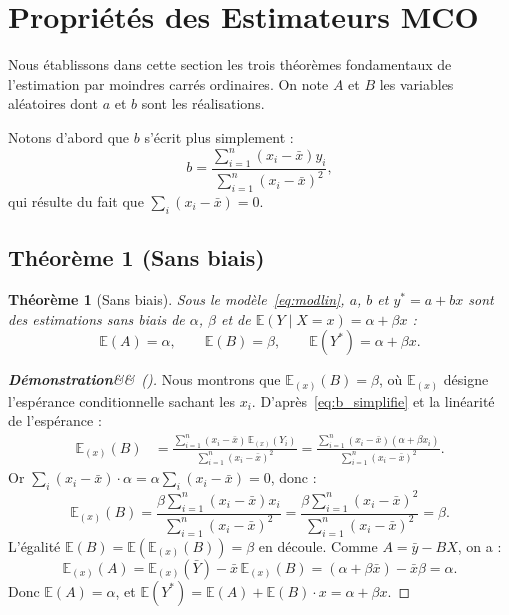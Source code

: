 \documentclass[12pt,a4paper]{article}
\newtheorem{theoreme}{Théorème}[section]
\theoremstyle{definition}
\theoremstyle{remark}
\newenvironment{demonstration}[1][]
  {\begin{proof}[\textbf{Démonstration}\ifx&#1&\else\ (#1)\fi]}
  {\end{proof}}
\newcommand{\Esp}{\mathbb{E}}
\newcommand{\xbar}{\bar{x}}
\newcommand{\ybar}{\bar{y}}
\begin{document}

\section{Propriétés des Estimateurs MCO}
\label{sec:proprietes}

Nous établissons dans cette section les trois théorèmes fondamentaux
de l'estimation par moindres carrés ordinaires. On note $A$ et $B$ les variables
aléatoires dont $a$ et $b$ sont les réalisations.

Notons d'abord que $b$ s'écrit plus simplement :
\begin{equation}
  \label{eq:b_simplifie}
  b = \frac{\sum_{i=1}^n (x_i - \xbar) y_i}{\sum_{i=1}^n (x_i - \xbar)^2},
\end{equation}
qui résulte du fait que $\sum_i (x_i - \xbar) = 0$.

  
\subsection{Théorème 1 (Sans biais)}

\begin{theoreme}[Sans biais]
\label{thm:unbiased}
Sous le modèle~\eqref{eq:modlin}, $a$, $b$ et $y^* = a + bx$ sont des estimations
sans biais de $\alpha$, $\beta$ et de $\Esp(Y \mid X = x) = \alpha + \beta x$ :
\[
  \Esp(A) = \alpha, \qquad \Esp(B) = \beta, \qquad \Esp(Y^*) = \alpha + \beta x.
\]
\end{theoreme}

\begin{demonstration}
Nous montrons que $\Esp_{(x)}(B) = \beta$, où $\Esp_{(x)}$ désigne l'espérance
conditionnelle sachant les $x_i$.
D'après~\eqref{eq:b_simplifie} et la linéarité de l'espérance :
\begin{align*}
  \Esp_{(x)}(B)
  &= \frac{\sum_{i=1}^n (x_i - \xbar)\,\Esp_{(x)}(Y_i)}{\sum_{i=1}^n (x_i - \xbar)^2}
   = \frac{\sum_{i=1}^n (x_i - \xbar)(\alpha + \beta x_i)}{\sum_{i=1}^n (x_i - \xbar)^2}.
\end{align*}
Or $\sum_i (x_i - \xbar)\cdot\alpha = \alpha\sum_i(x_i-\xbar) = 0$, donc :
\[
  \Esp_{(x)}(B) = \frac{\beta\sum_{i=1}^n (x_i - \xbar) x_i}
                       {\sum_{i=1}^n (x_i - \xbar)^2}
               = \frac{\beta\sum_{i=1}^n (x_i - \xbar)^2}
                       {\sum_{i=1}^n (x_i - \xbar)^2} = \beta.
\]
L'égalité $\Esp(B) = \Esp(\Esp_{(x)}(B)) = \beta$ en découle.
Comme $A = \ybar - BX$, on a :
\[
  \Esp_{(x)}(A) = \Esp_{(x)}(\bar{Y}) - \xbar\,\Esp_{(x)}(B)
                = (\alpha + \beta\xbar) - \xbar\beta = \alpha.
\]
Donc $\Esp(A) = \alpha$, et $\Esp(Y^*) = \Esp(A) + \Esp(B)\cdot x = \alpha + \beta x$.
\end{demonstration}
\end{document}
